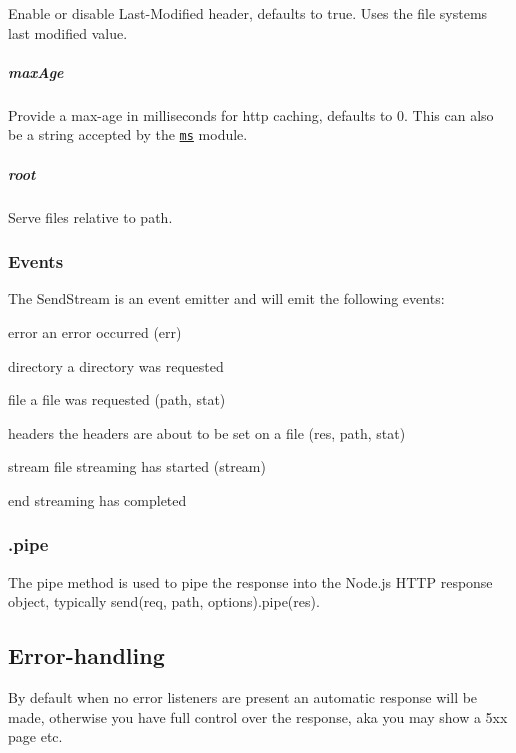 Enable or disable {\ttfamily Last-\/\+Modified} header, defaults to true. Uses the file system\textquotesingle{}s last modified value.

\subparagraph*{max\+Age}

Provide a max-\/age in milliseconds for http caching, defaults to 0. This can also be a string accepted by the \href{https://www.npmjs.org/package/ms#readme}{\tt ms} module.

\subparagraph*{root}

Serve files relative to {\ttfamily path}.

\subsubsection*{Events}

The {\ttfamily Send\+Stream} is an event emitter and will emit the following events\+:


\begin{DoxyItemize}
\item {\ttfamily error} an error occurred {\ttfamily (err)}
\item {\ttfamily directory} a directory was requested
\item {\ttfamily file} a file was requested {\ttfamily (path, stat)}
\item {\ttfamily headers} the headers are about to be set on a file {\ttfamily (res, path, stat)}
\item {\ttfamily stream} file streaming has started {\ttfamily (stream)}
\item {\ttfamily end} streaming has completed
\end{DoxyItemize}

\subsubsection*{.pipe}

The {\ttfamily pipe} method is used to pipe the response into the Node.\+js H\+T\+T\+P response object, typically {\ttfamily send(req, path, options).pipe(res)}.

\subsection*{Error-\/handling}

By default when no {\ttfamily error} listeners are present an automatic response will be made, otherwise you have full control over the response, aka you may show a 5xx page etc.


